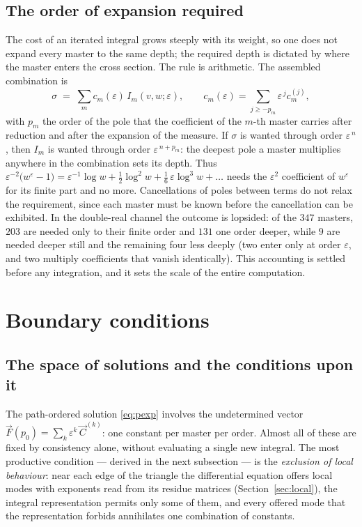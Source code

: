 \documentclass[11pt]{article}
\newcommand{\eps}{\varepsilon}
\begin{document}
\subsection{The order of expansion required}

The cost of an iterated integral grows steeply with its weight, so
one does not expand every master to the same depth; the required
depth is dictated by where the master enters the cross section.  The
rule is arithmetic.  The assembled combination is
\begin{equation}
  \sigma \;=\; \sum_m c_m(\eps)\, I_m(v,w;\eps),
  \qquad
  c_m(\eps) = \sum_{j \ge -p_m} \eps^{\,j} c_m^{(j)} ,
\end{equation}
with $p_m$ the order of the pole that the coefficient of the $m$-th
master carries after reduction and after the expansion of the
measure.  If $\sigma$ is wanted through order $\eps^{\,n}$, then
$I_m$ is wanted through order $\eps^{\,n + p_m}$: the deepest pole a
master multiplies anywhere in the combination sets its depth.  Thus
$\eps^{-2}\big(w^{\eps} - 1\big) = \eps^{-1}\log w +
\tfrac12\log^2 w + \tfrac16\,\eps\log^3 w + \dots$ needs the
$\eps^{2}$ coefficient of $w^\eps$ for its finite part and no more.
Cancellations of poles between terms do not relax the requirement,
since each master must be known before the cancellation can be
exhibited.  In the double-real
channel the outcome is lopsided: of the $347$ masters, $203$ are
needed only to their finite order and $131$ one order deeper, while
$9$ are needed deeper still and the remaining four less deeply (two
enter only at order $\eps$, and two multiply coefficients that
vanish identically).  This accounting is settled before any
integration, and it sets the scale of the entire computation.

\section{Boundary conditions}
\label{sec:boundary}

\subsection{The space of solutions and the conditions upon it}

The path-ordered solution \eqref{eq:pexp} involves the undetermined
vector $\vec F(p_0) = \sum_k \eps^k\,\vec C^{(k)}$: one constant per
master per order.  Almost all of these are fixed by consistency
alone, without evaluating a single new integral.  The most productive
condition --- derived in the next subsection --- is the
\emph{exclusion of local behaviour}: near each edge of the triangle
the differential equation offers local modes with exponents read from
its residue matrices (Section~\ref{sec:local}), the integral
representation permits only some of them, and every offered mode that
the representation forbids annihilates one combination of constants.
\end{document}
